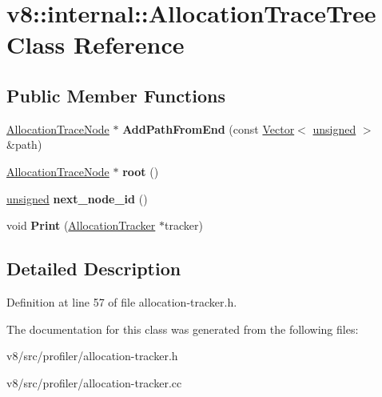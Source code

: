 \hypertarget{classv8_1_1internal_1_1AllocationTraceTree}{}\section{v8\+:\+:internal\+:\+:Allocation\+Trace\+Tree Class Reference}
\label{classv8_1_1internal_1_1AllocationTraceTree}
\subsection*{Public Member Functions}
\begin{DoxyCompactItemize}
\item 
\mbox{\label{classv8_1_1internal_1_1AllocationTraceTree_ac5d8e76d5c1250e5a0c0453d79fc656e}} 
\mbox{\hyperlink{classv8_1_1internal_1_1AllocationTraceNode}{Allocation\+Trace\+Node}} $\ast$ {\bfseries Add\+Path\+From\+End} (const \mbox{\hyperlink{classv8_1_1internal_1_1Vector}{Vector}}$<$ \mbox{\hyperlink{classunsigned}{unsigned}} $>$ \&path)
\item 
\mbox{\label{classv8_1_1internal_1_1AllocationTraceTree_af36cd4ae9797ba6e8681349f3db7d0b0}} 
\mbox{\hyperlink{classv8_1_1internal_1_1AllocationTraceNode}{Allocation\+Trace\+Node}} $\ast$ {\bfseries root} ()
\item 
\mbox{\label{classv8_1_1internal_1_1AllocationTraceTree_aed92bbd12c4ca3ea8dfabf9f3ce16d9e}} 
\mbox{\hyperlink{classunsigned}{unsigned}} {\bfseries next\+\_\+node\+\_\+id} ()
\item 
\mbox{\label{classv8_1_1internal_1_1AllocationTraceTree_a37ac3b1e978232c6150a1d3edf4da9ce}} 
void {\bfseries Print} (\mbox{\hyperlink{classv8_1_1internal_1_1AllocationTracker}{Allocation\+Tracker}} $\ast$tracker)
\end{DoxyCompactItemize}


\subsection{Detailed Description}


Definition at line 57 of file allocation-\/tracker.\+h.



The documentation for this class was generated from the following files\+:\begin{DoxyCompactItemize}
\item 
v8/src/profiler/allocation-\/tracker.\+h\item 
v8/src/profiler/allocation-\/tracker.\+cc\end{DoxyCompactItemize}
